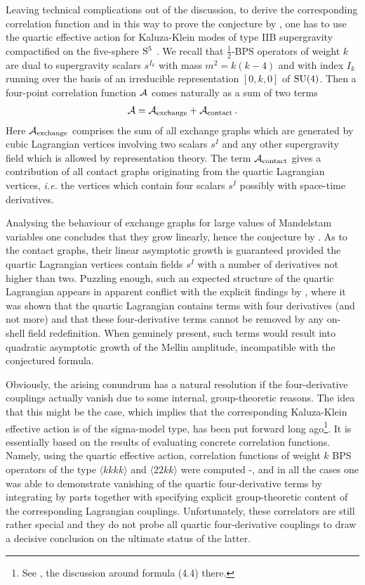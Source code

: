 \documentclass[12pt,a4paper]{article}
\numberwithin{equation}{section}
\newcommand{\bea}{\begin{eqnarray}}
\newcommand{\eea}{\end{eqnarray}}
\newcommand{\sfrac}[2]{{\textstyle\frac{#1}{#2}}}
\begin{document}
Leaving technical complications out of the  discussion, to derive the corresponding correlation function  and in this way to prove the conjecture by  \cite{Rastelli:2016nze},  one has to use 
the quartic effective action for Kaluza-Klein modes of type IIB supergravity compactified on the five-sphere ${\rm S}^5$ \cite{Arutyunov:1999fb}.  
We recall that $\sfrac{1}{2}$-BPS operators of weight $k$ are dual to supergravity scalars $s^{I_k}$ with mass $m^2=k(k-4)$ and with index $I_k$ 
running over the basis of an irreducible representation $[0,k,0]$ 
of ${\rm SU(4)}$. Then a four-point correlation function ${\cal A}$  comes naturally as a sum of two terms  
\bea
\nonumber
{\cal A}={\cal A}_{\rm exchange}+{\cal A}_{\rm contact}\, .
\eea
Here ${\cal A}_{\rm exchange}$ comprises the sum of all exchange graphs which are generated by cubic Lagrangian vertices involving two scalars $s^I$ and any other supergravity 
field which is allowed by representation theory. The term ${\cal A}_{\rm contact}$  gives a contribution of all contact graphs originating from the quartic Lagrangian vertices, {\it i.e.}
the vertices which contain four scalars $s^I$ possibly with space-time derivatives.  

Analysing the behaviour of exchange graphs for large values of Mandelstam variables one concludes that they grow linearly, hence the conjecture by  \cite{Rastelli:2016nze}.
As to the contact graphs, their linear asymptotic growth is guaranteed provided the quartic Lagrangian vertices contain fields $s^I$ with a number of derivatives not higher than two.
Puzzling enough, such an  expected structure of the quartic Lagrangian appears in apparent conflict with the explicit findings by  \cite{Arutyunov:1999fb}, where it was 
shown that the quartic Lagrangian contains terms with four derivatives (and not more) and that these four-derivative terms cannot be removed by any on-shell field redefinition.
When genuinely present, such terms would result into quadratic asymptotic growth of the Mellin amplitude, incompatible with the conjectured formula.    

Obviously, the arising conundrum has a natural resolution if the four-derivative couplings actually vanish due to some internal, group-theoretic reasons. 
The idea that this might be the case, which implies that the corresponding Kaluza-Klein effective action is of the sigma-model type, 
has been put forward long ago\footnote{See \cite{Arutyunov:2002fh}, the discussion around formula (4.4) there.}. It is essentially based on the results of evaluating
concrete correlation functions. Namely,  using the quartic effective action, correlation functions of weight $k$ BPS operators of the type $\langle kkkk\rangle$
and $\langle 22kk\rangle$ were computed  \cite{Arutyunov:2002fh}-\cite{Uruchurtu:2011wh}, and in all the cases one was able to demonstrate vanishing of  the quartic 
four-derivative terms by integrating by parts together with specifying  explicit group-theoretic content of the corresponding Lagrangian couplings. 
Unfortunately, these correlators are still rather special and they do not probe all quartic four-derivative couplings to draw a decisive conclusion on the ultimate status of the latter.  
\end{document}
